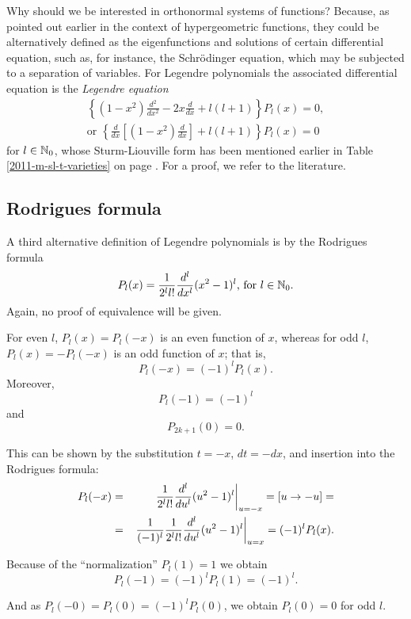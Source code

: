 Why should we be interested in orthonormal systems of functions?
Because, as pointed out earlier in the context of hypergeometric functions,
they could be alternatively defined as the eigenfunctions and solutions of certain differential equation,
such as, for instance, the Schr\"odinger equation, which may be subjected to a separation of variables.
For Legendre polynomials the associated differential equation is the  {\em Legendre equation}
\begin{equation}
\begin{split}
\left\{
(1-x^2) \frac{d^2}{dx^2}
- 2x  \frac{d}{dx} +l(l+1)
\right\}P_l(x) = 0,
\\
\textrm{or } \left\{  \frac{d }{dx }\left[\left(1-x^2\right)\frac{d }{dx }\right]
+
 l(l+1) \right\}  P_l(x)= 0
\end{split}
\label{2011-m-ch-sfelpede}
\end{equation}
for $l\in {\Bbb N}_0$,
whose Sturm-Liouville form has been mentioned earlier in Table \ref{2011-m-sl-t-varieties}
on page \pageref{2011-m-sl-t-varieties}.
For a proof, we refer to the literature.


\subsection{Rodrigues formula}

A third alternative definition  of Legendre polynomials
is by the  Rodrigues formula
\begin{equation}
P_l(x)=\frac{1}{2^ll!}\frac{d^l}{dx^l}(x^2-1)^l \textrm{, for }l\in {\Bbb N}_0.
\label{2011-m-ch-sfrf}
\end{equation}
Again, no proof of equivalence will be given.

For even $l$, $P_l(x)=P_l(-x)$ is an even function of $x$,
whereas
for odd $l$, $P_l(x)=-P_l(-x)$ is an odd function of $x$;
that is,
\begin{equation}
P_l(-x)=(-1)^lP_l(x).
\end{equation}
Moreover,
\begin{equation}
P_l(-1)=(-1)^l
\end{equation}
and
\begin{equation}
P_{2k+1}(0)=0.
\end{equation}




{\color{OliveGreen}
\bproof

This can be shown by  the
substitution
 $t=-x$, $dt=-dx$, and insertion into  the  Rodrigues formula:
\begin{eqnarray*}
   P_l(-x)&=&\left.{1\over 2^ll!}{d^l\over du^l}(u^2-1)^l\right|_{u=-x}
   =[u\to-u]=\\
   &=&\left.{1\over(-1)^l}{1\over2^ll!}{d^l\over du^l}(u^2-1)^l
   \right|_{u=x}=(-1)^lP_l(x).
\end{eqnarray*}

Because of the ``normalization'' $P_l(1)=1$ we obtain $$P_l(-1)=(-1)^lP_l(1)=(-1)^l.$$

And as $P_l(-0)=P_l(0)=(-1)^lP_l(0)$, we obtain $P_l(0)=0$ for odd $l$.


\eproof
}



